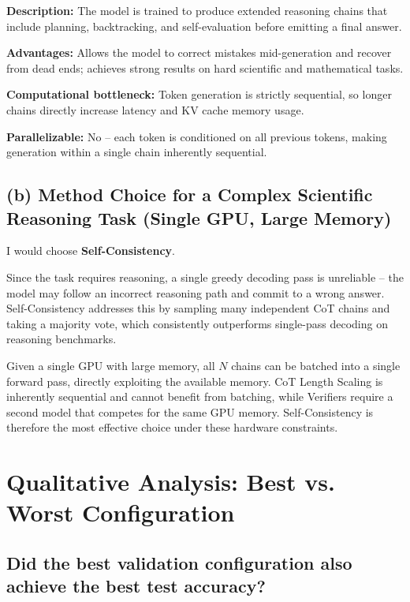 \documentclass[12pt]{article}
\begin{document}
\begin{enumerate}
    \textbf{Description:} The model is trained to produce extended reasoning chains that
    include planning, backtracking, and self-evaluation before emitting a final answer.

    \textbf{Advantages:} Allows the model to correct mistakes mid-generation and recover
    from dead ends; achieves strong results on hard scientific and mathematical tasks.

    \textbf{Computational bottleneck:} Token generation is strictly sequential, so longer
    chains directly increase latency and KV cache memory usage.

    \textbf{Parallelizable:} No -- each token is conditioned on all previous tokens,
    making generation within a single chain inherently sequential.

\end{enumerate}

\subsection*{(b) Method Choice for a Complex Scientific Reasoning Task (Single GPU, Large Memory)}

I would choose \textbf{Self-Consistency}.

Since the task requires reasoning, a single greedy decoding pass is unreliable -- the
model may follow an incorrect reasoning path and commit to a wrong answer. Self-Consistency
addresses this by sampling many independent CoT chains and taking a majority vote, which
consistently outperforms single-pass decoding on reasoning benchmarks.

Given a single GPU with large memory, all $N$ chains can be batched into a single forward
pass, directly exploiting the available memory. CoT Length Scaling is inherently sequential
and cannot benefit from batching, while Verifiers require a second model that competes for
the same GPU memory. Self-Consistency is therefore the most effective choice under these
hardware constraints.

\section*{Qualitative Analysis: Best vs. Worst Configuration}

\subsection*{Did the best validation configuration also achieve the best test accuracy?}
\end{document}
